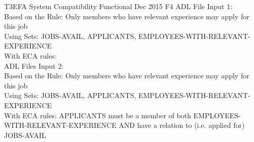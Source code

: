 \documentclass[12pt]{report}
\begin{document}







\systemTest
{T3}{EFA System Compatibility}
{Functional }
{Dec 2015}
{F4}
ADL File Input 1: \\
	Based on the Rule: Only members who have relevant experience may apply for 
	this 
	job \\
	Using Sets: JOBS-AVAIL, APPLICANTS, EMPLOYEES-WITH-RELEVANT-EXPERIENCE \\
	With ECA rules:\\
	ADL Files Input 2:\\
	Based on the Rule: Only members who have relevant experience may apply for 
	this 
	job \\
	Using Sets: JOBS-AVAIL, APPLICANTS, EMPLOYEES-WITH-RELEVANT-EXPERIENCE \\
	With ECA rules: APPLICANTS must be a member of both 
	EMPLOYEES-WITH-RELEVANT-EXPERIENCE AND have a relation to (i.e. applied 
	for) 
	JOBS-AVAIL \\
	
\end{document}
